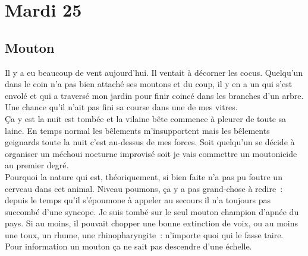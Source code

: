﻿\section*{Mardi 25}
\subsection*{Mouton}
Il y a eu beaucoup de vent aujourd’hui. Il ventait à décorner les cocus. Quelqu’un dans le coin n’a pas bien attaché ses moutons et du coup, il y en a un qui s’est envolé et qui a traversé mon jardin pour finir coincé dans les branches d’un arbre. Une chance qu’il n’ait pas fini sa course dans une de mes vitres.\\
Ça y est la nuit est tombée et la vilaine bête commence à pleurer de toute sa laine. En temps normal les bêlements m’insupportent mais les bêlements geignards toute la nuit c’est au-dessus de mes forces. Soit quelqu’un se décide à organiser un méchoui nocturne improvisé soit je vais commettre un moutonicide au premier degré. \\
Pourquoi la nature qui est, théoriquement, si bien faite n’a pas pu foutre un cerveau dans cet animal. Niveau poumons, ça y a pas grand-chose à redire : depuis le temps qu’il s’époumone à appeler au secours il n’a toujours pas succombé d’une syncope. Je suis tombé sur le seul mouton champion d’apnée du pays. Si au moins, il pouvait chopper une bonne extinction de voix, ou au moins une toux, un rhume, une rhinopharyngite : n’importe quoi qui le fasse taire. \\
Pour information un mouton ça ne sait pas descendre d’une échelle.
